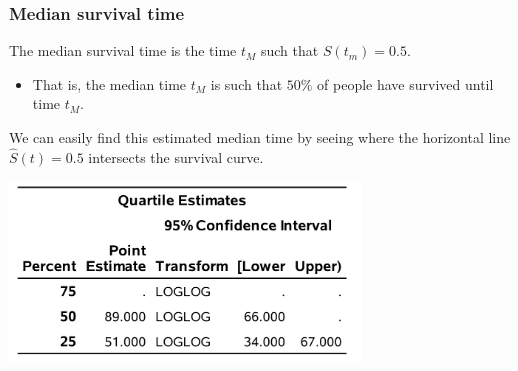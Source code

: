 \documentclass{beamer}
\begin{document}
\begin{frame}[fragile]
\frametitle{Median survival time}
The median survival time is the time $t_M$ such that $S(t_m) = 0.5$.
\begin{itemize}
 \item That is, the median time $t_M$ is such that $50\%$ of people have survived until time $t_M$. 
\end{itemize}
 We can easily find this estimated median time by seeing where the horizontal line $\widehat{S}(t) = 0.5$ intersects the survival curve.
\begin{center}
\includegraphics[width = 0.7\textwidth]{img/c7/slides7e07}
\end{center}

\end{frame}

%   
\end{document}
